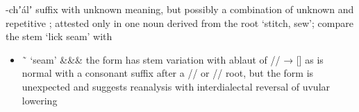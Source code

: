 \begin{morphdesc}[resume*=alphalist]
\item[-chʼálʼ]\label{m:-chʼálʼ}
	suffix with unknown meaning, but possibly a combination of unknown 
		and repetitive ;
	attested only in one noun derived from the root  ‘stitch, sew’;
	compare the stem  ‘lick seam’ with 
	\begin{itemize}
	\item	{} \~\  ‘seam’
		\parencite[f01/23]{leer:1973}
			{&\·&\·&\·}
		\newline
		the form  has  stem variation
			with ablaut of // → [] as is normal with a consonant suffix
			after a // or // root,
		but the form  is unexpected and suggests reanalysis
			with interdialectal reversal of uvular lowering
	\end{itemize}


\end{morphdesc}
